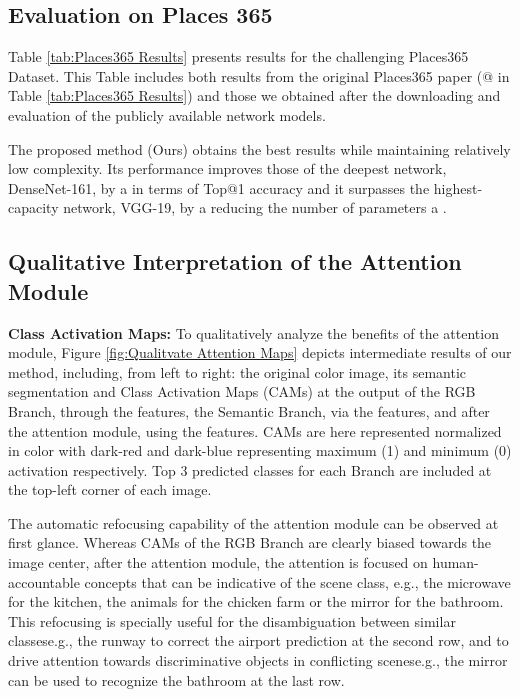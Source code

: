 \documentclass[review, 3p, sort&compress]{elsarticle}
\begin{document}
\subsection*{Evaluation on Places 365}
Table \ref{tab:Places365 Results} presents results for the challenging Places365 Dataset. This Table includes both results from the original Places365 paper (@\cite{zhou2018places} in Table \ref{tab:Places365 Results}) and those we obtained after the downloading and evaluation of the publicly available network models. 

The proposed method (Ours) obtains the best results while maintaining relatively low complexity. Its performance improves those of the deepest network, DenseNet-161, by a  in terms of Top@1 accuracy and it surpasses the highest-capacity network, VGG-19, by a  reducing the number of parameters a .

\subsection{Qualitative Interpretation of the Attention Module}
\textbf{Class Activation Maps:}
To qualitatively analyze the benefits of the attention module, Figure \ref{fig:Qualitvate Attention Maps} depicts intermediate results of our method, including, from left to right: the original color image, its semantic segmentation and Class Activation Maps (CAMs) \cite{zhou2015cnnlocalization} at the output of the RGB Branch, through the  features, the Semantic Branch, via the  features, and after the attention module, using the  features. CAMs are here represented normalized in color with dark-red and dark-blue representing maximum (1) and minimum (0) activation respectively. Top 3 predicted classes for each Branch are included at the top-left corner of each image.

The automatic refocusing capability of the attention module can be observed at first glance. Whereas CAMs of the RGB Branch are clearly biased towards the image center, after the attention module, the attention is focused on human-accountable concepts that can be indicative of the scene class, e.g., the microwave for the kitchen, the animals for the chicken farm or the mirror for the bathroom. This refocusing is specially useful for the disambiguation between similar classes\textemdash e.g., the runway to correct the airport prediction at the second row, and to drive attention towards discriminative objects in conflicting scenes\textemdash e.g., the mirror can be used to recognize the bathroom at the last row.
\end{document}
